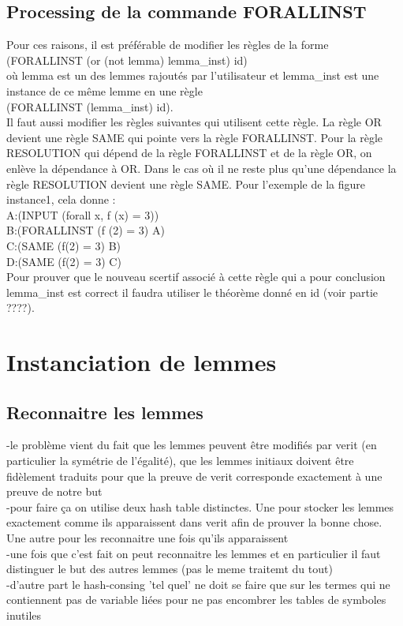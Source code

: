 \documentclass[11pt]{article}
\begin{document}
\subsection{Processing de la commande FORALLINST} \label{processing_forallinst}

Pour ces raisons, il est préférable de modifier les règles de la forme \\
     (FORALLINST (or (not lemma) lemma\_inst) id)\\
où lemma est un des lemmes rajoutés par l'utilisateur et lemma\_inst est une instance de ce même lemme en une règle \\

(FORALLINST (lemma\_inst) id).\\

Il faut aussi modifier les règles suivantes qui utilisent cette règle. La règle OR devient une règle SAME qui pointe vers la règle FORALLINST. Pour la règle RESOLUTION qui dépend de la règle FORALLINST et de la règle OR, on enlève la dépendance à OR. Dans le cas où il ne reste plus qu'une dépendance la règle RESOLUTION devient une règle SAME. Pour l'exemple de la figure instance1, cela donne : \\

A:(INPUT (forall x, f (x) = 3)) \\
B:(FORALLINST (f (2) = 3) A) \\
C:(SAME (f(2) = 3) B) \\
D:(SAME (f(2) = 3) C) \\

Pour prouver que le nouveau scertif associé à cette règle qui a pour conclusion lemma\_inst est correct il faudra utiliser le théorème donné en id (voir partie ????).

\section{Instanciation de lemmes}

\subsection{Reconnaitre les lemmes}
-le problème vient du fait que les lemmes peuvent être modifiés par verit (en particulier la symétrie de l'égalité), que les lemmes initiaux doivent être fidèlement traduits pour que la preuve de verit corresponde exactement à une preuve de notre but \\
-pour faire ça on utilise deux hash table distinctes. Une pour stocker les lemmes exactement comme ils apparaissent dans verit afin de prouver la bonne chose. Une autre pour les reconnaitre une fois qu'ils apparaissent\\
-une fois que c'est fait on peut reconnaitre les lemmes et en particulier il faut distinguer le but des autres lemmes (pas le meme traitemt du tout)\\
-d'autre part le hash-consing 'tel quel' ne doit se faire que sur les termes qui ne contiennent pas de variable liées pour ne pas encombrer les tables de symboles inutiles\\
\end{document}
